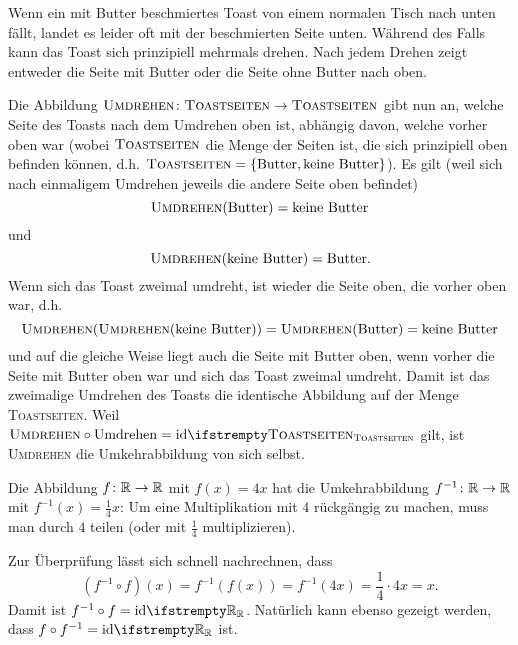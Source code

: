 \documentclass[../../main.tex]{subfiles}
\begin{document}
\begin{example}{}
    Wenn ein mit Butter beschmiertes Toast von einem normalen Tisch nach unten fällt, landet es leider oft mit der beschmierten Seite unten. Während des Falls kann das Toast sich prinzipiell mehrmals drehen. Nach jedem Drehen zeigt entweder die Seite mit Butter oder die Seite ohne Butter nach oben.
    
    Die Abbildung $\textsc{Umdrehen}\colon\textsc{Toastseiten}\rightarrow\textsc{Toastseiten}$ gibt nun an, welche Seite des Toasts nach dem Umdrehen oben ist, abhängig davon, welche vorher oben war (wobei $\textsc{Toastseiten}$ die Menge der Seiten ist, die sich prinzipiell oben befinden können, d.h. $\textsc{Toastseiten}=\{\text{Butter},\text{keine Butter}\}$). Es gilt (weil sich nach einmaligem Umdrehen jeweils die andere Seite oben befindet)
    \[\textsc{Umdrehen}(\text{Butter})=\text{keine Butter}\] und \[\textsc{Umdrehen}(\text{keine Butter})=\text{Butter}.\]
    Wenn sich das Toast zweimal umdreht, ist wieder die Seite oben, die vorher oben war, d.h. \[\textsc{Umdrehen}(\textsc{Umdrehen}(\text{keine Butter}))=\textsc{Umdrehen}(\text{Butter})=\text{keine Butter}\]
    und auf die gleiche Weise liegt auch die Seite mit Butter oben, wenn vorher die Seite mit Butter oben war und sich das Toast zweimal umdreht. Damit ist das zweimalige Umdrehen des Toasts die identische Abbildung auf der Menge \textsc{Toastseiten}. Weil $\textsc{Umdrehen}\circ \text{Umdrehen}=\ident[\textsc{Toastseiten}]$ gilt, ist \textsc{Umdrehen} die Umkehrabbildung von sich selbst.
\end{example}

\begin{example}{}
    Die Abbildung $f\colon\mathbb{R}\rightarrow\mathbb{R}$ mit $f(x)=4x$ hat die Umkehrabbildung $f^{-1}\colon\mathbb{R}\rightarrow\mathbb{R}$ mit $f^{-1}(x)=\frac{1}{4}x$: Um eine Multiplikation mit $4$ rückgängig zu machen, muss man durch $4$ teilen (oder mit $\frac{1}{4}$ multiplizieren).
    
    Zur Überprüfung lässt sich schnell nachrechnen, dass \[(f^{-1}\circ f)(x)=f^{-1}(f(x))=f^{-1}(4x)=\frac{1}{4}\cdot 4x=x.\] 
    Damit ist $f^{-1}\circ f=\ident[\Real]$. Natürlich kann ebenso gezeigt werden, dass $f\circ f^{-1}=\ident[\Real]$ ist.
\end{example}
\end{document}
